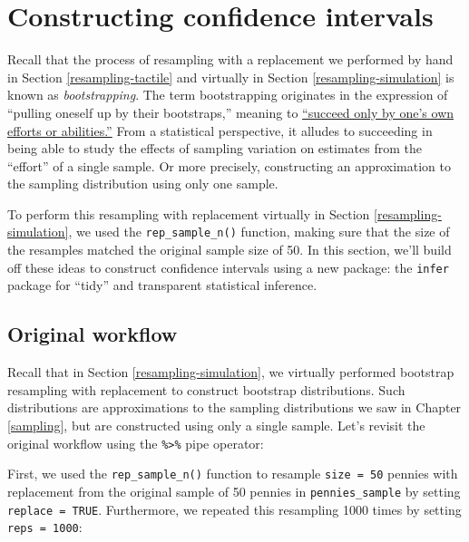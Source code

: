 \documentclass[
]{book}
\begin{document}
\hypertarget{bootstrap-process}{%
\section{Constructing confidence intervals}\label{bootstrap-process}}

Recall that the process of resampling with a replacement we performed by hand in Section \ref{resampling-tactile} and virtually in Section \ref{resampling-simulation} is known as  \emph{bootstrapping}. The term bootstrapping originates in the expression of ``pulling oneself up by their bootstraps,'' meaning to \href{https://en.wiktionary.org/wiki/pull_oneself_up_by_one\%27s_bootstraps}{``succeed only by one's own efforts or abilities.''} From a statistical perspective, it alludes to succeeding in being able to study the effects of sampling variation on estimates from the ``effort'' of a single sample. Or more precisely,  constructing an approximation to the sampling distribution using only one sample.

To perform this resampling with replacement virtually in Section \ref{resampling-simulation}, we used the \texttt{rep\_sample\_n()} function, making sure that the size of the resamples matched the original sample size of 50. In this section, we'll build off these ideas to construct confidence intervals using a new package: the \texttt{infer} package for ``tidy'' and transparent statistical inference.

\hypertarget{original-workflow}{%
\subsection{Original workflow}\label{original-workflow}}

Recall that in Section \ref{resampling-simulation}, we virtually performed bootstrap resampling with replacement to construct bootstrap distributions. Such distributions are approximations to the sampling distributions we saw in Chapter \ref{sampling}, but are constructed using only a single sample. Let's revisit the original workflow using the \texttt{\%\textgreater{}\%} pipe operator:

First, we used the \texttt{rep\_sample\_n()} function to resample \texttt{size\ =\ 50} pennies with replacement from the original sample of 50 pennies in \texttt{pennies\_sample} by setting \texttt{replace\ =\ TRUE}. Furthermore, we repeated this resampling 1000 times by setting \texttt{reps\ =\ 1000}:
\end{document}
